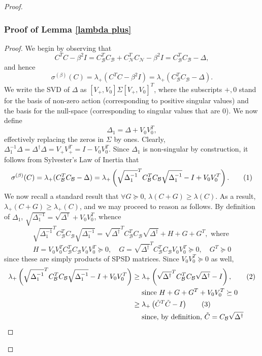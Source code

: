\documentclass[11pt]{article}
\newcommand{\Geq}{\succeq}
\newcommand{\B}{\mathcal{B}}
\newcommand{\N}{\mathcal{N}}
\newcommand{\0}{\ensuremath{\mathbf{0}}}
\renewcommand{\>}{\succ}
\newcommand{\<}{\prec}
\newcommand\numberthis{\addtocounter{equation}{1}\tag{\theequation}}
\begin{document}
\begin{proof}
\subsubsection{Proof of Lemma \ref{lambda plus}}
\begin{proof}
We begin by observing that
\[ C^T C - \beta^2 I  = C_{\B} ^T C_{\B} + C_{\N} ^T C_{\N} - \beta^2 I = C_{\B} ^T C_{\B}  - \Delta, \]
and hence
\[ \sigma^{(\beta)} (C) = \lambda_+ \left( C^T C - \beta^2 I \right) = \lambda_+ \left( C_{\B} ^T C_{\B}  - \Delta \right). \]
We write the SVD of $\Delta$ as $[V_+, V_0] \Sigma [V_+, V_0]^T$, where the subscripts $+, 0$ stand for the basis of non-zero action (corresponding to positive singular values) and the basis for the null-space (corresponding to singular values that are 0). We now define 
\[ \Delta_1 = \Delta + V_0 V_0 ^T, \]
effectively replacing the zeros in $\Sigma$ by ones. Clearly, $\Delta_1 ^{-1} \Delta = \Delta^{\dagger} \Delta = V_+ V_+ ^T = I - V_0 V_0 ^T$. Since $\Delta_1$ is non-singular by construction, it follows from Sylvester's Law of Inertia that
\[ \sigma^{(\beta)} (C) = \lambda_+ (C_{\B} ^T C_{\B}  - \Delta) = \lambda_+ \left( \sqrt{\Delta_1 ^{-1}} ^T C_{\B} ^T C_{\B} \sqrt{\Delta_1 ^{-1}} -  I + V_0 V_0 ^T  \right) . \numberthis \label{beta station} \]
We now recall a standard result that $\forall G \Geq 0$, $\lambda(C + G) \geq \lambda(C)$. As a result, $\lambda_+ (C+G) \geq \lambda_+ (C)$, and we may proceed to reason as follows. By definition of $\Delta_1$, $\sqrt{\Delta_1^{-1}} = \sqrt{\Delta^{\dagger}} + V_0 V_0 ^T$, whence 
\[ \sqrt{ \Delta_1 ^{-1} } ^T C_{\B} ^T C_{\B} \sqrt{ \Delta_1 ^{-1}}  = \sqrt{\Delta^{\dagger}}^T C_{\B} ^T C_{\B} \sqrt{\Delta^{\dagger}} + H + G + G ^T, \text{ where } \]
\[ H = V_0 V_0 ^T C_{\B} ^T C_{\B} V_0 V_0 ^T \Geq 0, \quad  G = \sqrt{\Delta^{\dagger}}^T C_{\B} ^T C_{\B} V_0 V_0 ^T \Geq 0, \quad  G ^T \Geq 0 \] 
since these are simply products of SPSD matrices. Since $V_0 V_0 ^T \Geq 0$ as well, 
\begin{align*}
\lambda_+ \left( \sqrt{ \Delta_1 ^{-1} } ^T C_{\B} ^T C_{\B} \sqrt{ \Delta_1 ^{-1} } - I + V_0 V_0 ^T \right)  & \geq \lambda_+ \left( \sqrt{\Delta^{\dagger}}^T C_{\B} ^T C_{\B} \sqrt{\Delta^{\dagger}}  - I \right),  \numberthis \label{p2inv}\\ 
& \quad \text{ since } H + G + G ^T + V_0 V_0 ^T \Geq 0 \\
& \geq \lambda_+ \left( \tilde{C} ^T \tilde{C} - I \right) \numberthis \label{p2inv2} \\
& \quad \text{ since, by definition, } \tilde{C} = C_{\B} \sqrt{\Delta ^{\dagger}} \\

\end{align*}
\end{proof}
\end{proof}
\end{document}

